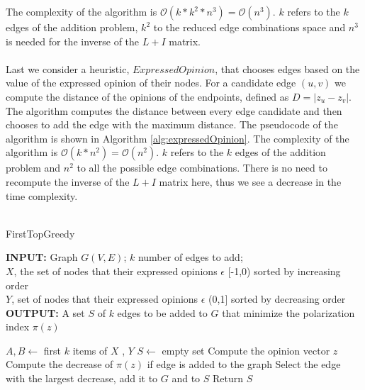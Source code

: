 \noindent The complexity of the algorithm is $\mathcal{O}(k * k^2 * n^3) = \mathcal{O}(n^3)$. $k$ refers to the $k$ edges of the addition problem, $k^2$ to the reduced edge combinations space and $n^3$ is needed for the inverse of the $L+I$ matrix.
\\
\\
Last we consider a heuristic, $ExpressedOpinion$, that chooses edges based on the value of the expressed opinion of their nodes. For a candidate edge $(u,v)$ we compute the distance of the opinions of the endpoints,  defined as $D=|z_u - z_v|$. The algorithm computes the distance between every edge candidate and then chooses to add the edge with the maximum distance. The pseudocode of the algorithm is shown in Algorithm \ref{alg:expressedOpinion}. The complexity of the algorithm is $\mathcal{O}(k * n^2) = \mathcal{O}(n^2)$. $k$ refers to the $k$ edges of the addition problem and $n^2$ to all the possible edge combinations. There is no need to recompute the inverse of the $L+I$ matrix here, thus we see a decrease in the time complexity.
\\
\\
\begin{algorithm}[htbp]
	\caption{FirstTopGreedy}
	\label{alg:ftgreedy}
	
	\begin{flushleft}
        		\textbf{INPUT:} Graph $G(V, E)$; $k$ number of edges to add;\\
		$X$, the set of nodes that their expressed opinions $\epsilon$ [-1,0) sorted by increasing order\\
		$Y$, set of nodes that their expressed opinions $\epsilon$ (0,1]  sorted by decreasing order\\
		\vspace{6pt}
        		\textbf{OUTPUT:} A set $S$ of $k$ edges to be added to $G$ that minimize the polarization \\ index $\pi(z)$
	\end{flushleft}
	
	\begin{algorithmic}[1]
		\STATE $A, B \leftarrow $ first $k$ items of $X$ , $Y$
		\STATE $S \leftarrow$ empty set 
			\STATE Compute the opinion vector $z$
				\STATE Compute the decrease of $\pi(z)$ if edge is added to the graph
			\ENDFOR
			\STATE Select the edge with the largest decrease, add it to $G$ and to $S$
		\ENDFOR
		\STATE Return $S$
	\end{algorithmic}
	
\end{algorithm}
		

